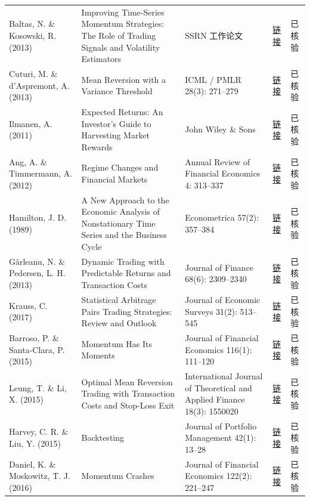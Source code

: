 \begin{longtable}{@{}>{\raggedright\arraybackslash}p{2.55cm}>{\raggedright\arraybackslash}p{4.7cm}>{\raggedright\arraybackslash}p{2.7cm}>{\raggedright\arraybackslash}p{1.9cm}>{\raggedright\arraybackslash}p{1.45cm}@{}}
Baltas, N. \& Kosowski, R. (2013) & Improving Time-Series Momentum Strategies: The Role of Trading Signals and Volatility Estimators & SSRN 工作论文 & \href{https://doi.org/10.2139/ssrn.2140091}{链接} & 已核验 \\
Cuturi, M. \& d'Aspremont, A. (2013) & Mean Reversion with a Variance Threshold & ICML / PMLR 28(3): 271--279 & \href{https://proceedings.mlr.press/v28/cuturi13.html}{链接} & 已核验 \\
Ilmanen, A. (2011) & Expected Returns: An Investor's Guide to Harvesting Market Rewards & John Wiley \& Sons & \href{https://doi.org/10.1002/9781118467190}{链接} & 已核验 \\
Ang, A. \& Timmermann, A. (2012) & Regime Changes and Financial Markets & Annual Review of Financial Economics 4: 313--337 & \href{https://doi.org/10.1146/annurev-financial-110311-101808}{链接} & 已核验 \\
Hamilton, J. D. (1989) & A New Approach to the Economic Analysis of Nonstationary Time Series and the Business Cycle & Econometrica 57(2): 357--384 & \href{https://doi.org/10.2307/1912559}{链接} & 已核验 \\
Gârleanu, N. \& Pedersen, L. H. (2013) & Dynamic Trading with Predictable Returns and Transaction Costs & Journal of Finance 68(6): 2309--2340 & \href{https://doi.org/10.1111/jofi.12080}{链接} & 已核验 \\
Krauss, C. (2017) & Statistical Arbitrage Pairs Trading Strategies: Review and Outlook & Journal of Economic Surveys 31(2): 513--545 & \href{https://doi.org/10.1111/joes.12153}{链接} & 已核验 \\
Barroso, P. \& Santa-Clara, P. (2015) & Momentum Has Its Moments & Journal of Financial Economics 116(1): 111--120 & \href{https://doi.org/10.1016/j.jfineco.2014.11.010}{链接} & 已核验 \\
Leung, T. \& Li, X. (2015) & Optimal Mean Reversion Trading with Transaction Costs and Stop-Loss Exit & International Journal of Theoretical and Applied Finance 18(3): 1550020 & \href{https://doi.org/10.1142/S021902491550020X}{链接} & 已核验 \\
Harvey, C. R. \& Liu, Y. (2015) & Backtesting & Journal of Portfolio Management 42(1): 13--28 & \href{https://doi.org/10.3905/jpm.2015.42.1.013}{链接} & 已核验 \\
Daniel, K. \& Moskowitz, T. J. (2016) & Momentum Crashes & Journal of Financial Economics 122(2): 221--247 & \href{https://doi.org/10.1016/j.jfineco.2015.12.002}{链接} & 已核验 \\

\end{longtable}
